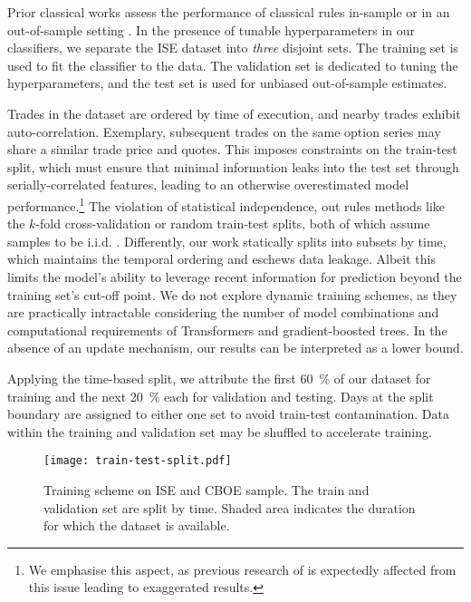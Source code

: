 Prior classical works assess the performance of classical rules in-sample \autocite[cp.][541]{ellisAccuracyTradeClassification2000} or in an out-of-sample setting \autocites[cp.][7--9]{grauerOptionTradeClassification2022}[][3814--3815]{chakrabartyTradeClassificationAlgorithms2007}. In the presence of tunable hyperparameters in our classifiers, we separate the \gls{ISE} dataset into \emph{three} disjoint sets. The training set is used to fit the classifier to the data. The validation set is dedicated to tuning the hyperparameters, and the test set is used for unbiased out-of-sample estimates.

Trades in the dataset are ordered by time of execution, and nearby trades exhibit auto-correlation. Exemplary, subsequent trades on the same option series may share a similar trade price and quotes. This imposes constraints on the train-test split, which must ensure that minimal information leaks into the test set through serially-correlated features, leading to an otherwise overestimated model performance.\footnote{We emphasise this aspect, as previous research of \textcite[][14]{ronenMachineLearningTrade2022} is expectedly affected from this issue leading to exaggerated results.} The violation of statistical independence, out rules methods like the $k$-fold cross-validation or random train-test splits, both of which assume samples to be i.i.d. \autocite[][103--105]{lopezdepradoAdvancesFinancialMachine2018}. Differently, our work statically splits into subsets by time, which maintains the temporal ordering and eschews data leakage. Albeit this limits the model's ability to leverage recent information for prediction beyond the training set's cut-off point. We do not explore dynamic training schemes, as they are practically intractable considering the number of model combinations and computational requirements of Transformers and gradient-boosted trees. In the absence of an update mechanism, our results can be interpreted as a lower bound.

Applying the time-based split, we attribute the first \SI{60}{\percent} of our dataset for training and the next \SI{20}{\percent} each for validation and testing. Days at the split boundary are assigned to either one set to avoid train-test contamination. Data within the training and validation set may be shuffled to accelerate training.

\begin{figure}[ht]
    \centering
    \texttt{[image: train-test-split.pdf]}
    \caption[Training Scheme on  and  Sample]{Training scheme on \gls{ISE} and \gls{CBOE} sample. The train and validation set are split by time. Shaded area  indicates the duration for which the dataset is available.}
    \label{fig:train-test-split}
\end{figure}

